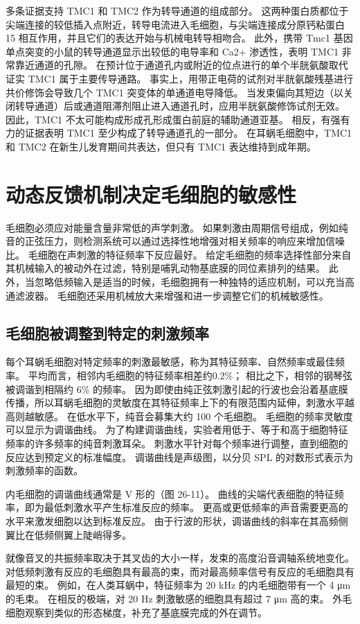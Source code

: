 多条证据支持 TMC1 和 TMC2 作为转导通道的组成部分。 这两种蛋白质都位于尖端连接的较低插入点附近，转导电流进入毛细胞，与尖端连接成分原钙粘蛋白 15 相互作用，并且它们的表达开始与机械电转导相吻合。 此外，携带 Tmc1 基因单点突变的小鼠的转导通道显示出较低的电导率和 Ca2+ 渗透性，表明 TMC1 非常靠近通道的孔隙。 在预计位于通道孔内或附近的位点进行的单个半胱氨酸取代证实 TMC1 属于主要传导通路。 事实上，用带正电荷的试剂对半胱氨酸残基进行共价修饰会导致几个 TMC1 突变体的单通道电导降低。 当发束偏向其短边（以关闭转导通道）后或通道阻滞剂阻止进入通道孔时，应用半胱氨酸修饰试剂无效。 因此，TMC1 不太可能构成形成孔形成蛋白前庭的辅助通道亚基。 相反，有强有力的证据表明 TMC1 至少构成了转导通道孔的一部分。 在耳蜗毛细胞中，TMC1 和 TMC2 在新生儿发育期间共表达，但只有 TMC1 表达维持到成年期。


\section{动态反馈机制决定毛细胞的敏感性}
毛细胞必须应对能量含量非常低的声学刺激。 如果刺激由周期信号组成，例如纯音的正弦压力，则检测系统可以通过选择性地增强对相关频率的响应来增加信噪比。 毛细胞在声刺激的特征频率下反应最好。 给定毛细胞的频率选择性部分来自其机械输入的被动外在过滤，特别是哺乳动物基底膜的同位素排列的结果。 此外，当忽略低频输入是适当的时候，毛细胞拥有一种独特的适应机制，可以充当高通滤波器。 毛细胞还采用机械放大来增强和进一步调整它们的机械敏感性。

\subsection{毛细胞被调整到特定的刺激频率}
每个耳蜗毛细胞对特定频率的刺激最敏感，称为其特征频率、自然频率或最佳频率。 平均而言，相邻内毛细胞的特征频率相差约0.2\%； 相比之下，相邻的钢琴弦被调谐到相隔约 6\% 的频率。 因为即使由纯正弦刺激引起的行波也会沿着基底膜传播，所以耳蜗毛细胞的灵敏度在其特征频率上下的有限范围内延伸，刺激水平越高则越敏感。 在低水平下，纯音会募集大约 100 个毛细胞。 毛细胞的频率灵敏度可以显示为调谐曲线。 为了构建调谐曲线，实验者用低于、等于和高于细胞特征频率的许多频率的纯音刺激耳朵。 刺激水平针对每个频率进行调整，直到细胞的反应达到预定义的标准幅度。 调谐曲线是声级图，以分贝 SPL 的对数形式表示为刺激频率的函数。

内毛细胞的调谐曲线通常是 V 形的（图 26-11）。 曲线的尖端代表细胞的特征频率，即为最低刺激水平产生标准反应的频率。 更高或更低频率的声音需要更高的水平来激发细胞以达到标准反应。 由于行波的形状，调谐曲线的斜率在其高频侧翼比在低频侧翼上陡峭得多。

就像音叉的共振频率取决于其叉齿的大小一样，发束的高度沿音调轴系统地变化。 对低频刺激有反应的毛细胞具有最高的束，而对最高频率信号有反应的毛细胞具有最短的束。 例如，在人类耳蜗中，特征频率为 20 kHz 的内毛细胞带有一个 4 μm 的毛束。 在相反的极端，对 20 Hz 刺激敏感的细胞具有超过 7 μm 高的束。 外毛细胞观察到类似的形态梯度，补充了基底膜完成的外在调节。

